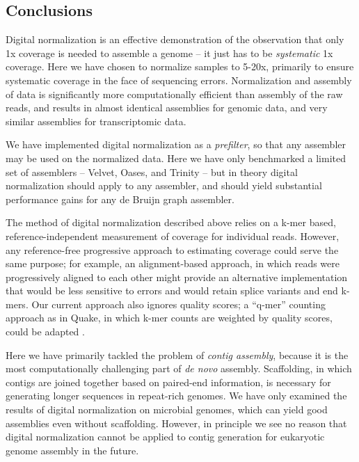\documentclass[10pt]{article}
\begin{document}

\subsection*{Conclusions}

Digital normalization is an effective demonstration of the
observation that only 1x coverage is needed to assemble a
genome -- it just has to be {\em systematic} 1x coverage.
Here we have chosen to normalize samples to 5-20x, primarily to ensure
systematic coverage in the face of sequencing errors.
Normalization and assembly of data is significantly more
computationally efficient than assembly of the raw reads,
and results in almost identical
assemblies for genomic data, and very similar assemblies for
transcriptomic data.

We have implemented digital normalization as a {\em prefilter}, so
that any assembler may be used on the normalized data.
Here we have only benchmarked a limited set of assemblers --
Velvet, Oases, and Trinity -- but in theory digital normalization should
apply to any assembler, and should yield substantial performance gains for
any de Bruijn graph assembler.

The method of digital normalization described above relies on a k-mer
based, reference-independent measurement of coverage for
individual reads.  However, any reference-free progressive approach to
estimating coverage could serve the same purpose; for example, an alignment-based
approach, in which reads were progressively aligned to each other
might provide an alternative implementation that would be
less sensitive to errors and would retain splice variants and end k-mers.
Our current approach also ignores
quality scores; a ``q-mer'' counting approach as in Quake, in which
k-mer counts are weighted by quality scores, could be
adapted \cite{pubmed21114842}.

Here we have primarily tackled the problem of {\em contig assembly},
because it is the most computationally challenging part of {\em de
  novo} assembly.  Scaffolding, in which contigs are joined together
based on paired-end information, is necessary for generating longer
sequences in repeat-rich genomes.  We have only examined the
results of digital normalization on microbial genomes, which can yield
good assemblies even without scaffolding.  However, in principle we
see no reason that digital normalization cannot be applied to contig
generation for eukaryotic genome assembly in the future.
\end{document}
